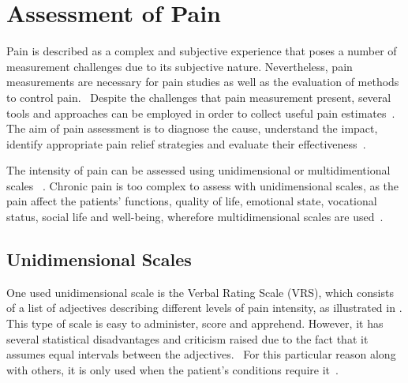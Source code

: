 \section{Assessment of Pain}
Pain is described as a complex and subjective experience that poses a number of measurement challenges due to its subjective nature. Nevertheless, pain measurements are necessary for pain studies as well as the evaluation of methods to control pain.~\cite{Jensen2001} %
Despite the challenges that pain measurement present, several tools and approaches can be employed in order to collect useful pain estimates~\cite{Younger2010}. The aim of pain assessment is to diagnose the cause, understand the impact, identify appropriate pain relief strategies and evaluate their effectiveness~\cite{Briggs2010}.


The intensity of pain can be assessed using unidimensional or multidimentional scales ~\cite{Jensen2001}.
Chronic pain is too complex to assess with unidimensional scales, as the pain affect the patients' functions, quality of life, emotional state, vocational status, social life and well-being, wherefore multidimensional scales are used~\cite{Ebert2010}. 


\subsection{Unidimensional Scales}
One used unidimensional scale is the Verbal Rating Scale (VRS), which consists of a list of adjectives describing different levels of pain intensity, as illustrated in . This type of scale is easy to administer, score and apprehend. However, it has several statistical disadvantages and criticism raised due to the fact that it assumes equal intervals between the adjectives.~\cite{Jensen2001} For this particular reason along with others, it is only used when the patient's conditions require it~\cite{Jensen1986}. 

